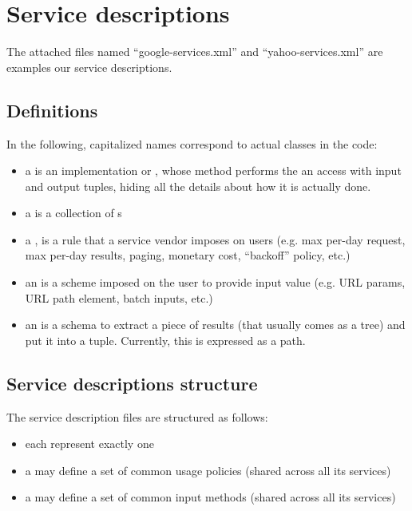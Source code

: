 \section{Service descriptions}
The attached files named ``google-services.xml'' and
``yahoo-services.xml'' are examples our service descriptions.

\subsection{Definitions} 
In the following, capitalized names correspond to actual classes in the
code:
\begin{itemize}
    \item a {\em {}} is an implementation or
      , whose  method performs the an access
      with input and output tuples, hiding all the details about how
      it is actually done.
    \item a {\em {}} is a collection of s
    \item a {\em {}}, is a rule that a service vendor imposes on
      users (e.g. max per-day request, max per-day results, paging,
      monetary cost, ``backoff'' policy, etc.)
    \item an {\em {}} is a scheme imposed on the user to provide
      input value (e.g. URL params, URL path element, batch inputs, etc.)
    \item an {\em {}} is a schema to extract a piece of results
      (that usually comes as a tree) and put it into a
      tuple. Currently, this is expressed as a path.
\end{itemize}

\subsection{Service descriptions structure}
The service description files are structured as follows:
\begin{itemize}
    \item each represent exactly one 
    \item a  may define a set of common usage
      policies (shared across all its services)
    \item a  may define a set of common input methods
      (shared across all its services)
\end{itemize}

